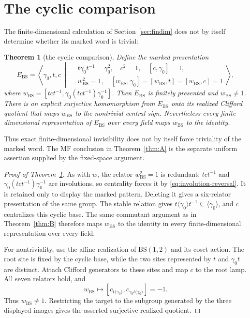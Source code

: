 \documentclass[11pt]{amsart}
\newcommand{\leanverified}[2]{\ignorespaces}
\newtheorem{theorem}{Theorem}[section]
\theoremstyle{definition}
\theoremstyle{remark}
\theoremstyle{plain}
\begin{document}
\section{The cyclic comparison}\label{sec:necessity}

The finite-dimensional calculation of
Section~\ref{sec:findim} does not by itself determine
whether its marked word is trivial:

\begin{theorem}[the cyclic comparison]\label{thm:C}
Define the marked presentation
\[
 E_{\mathrm{BS}}=\left\langle\gamma_0,t,c\ \middle|\
 \begin{aligned}
  &t\gamma_0t^{-1}=\gamma_0^2,\quad c^2=1,\quad[c,\gamma_0]=1,\\
  &w_{\mathrm{BS}}^2=1,\quad
    [w_{\mathrm{BS}},\gamma_0]=[w_{\mathrm{BS}},t]
      =[w_{\mathrm{BS}},c]=1
 \end{aligned}\right\rangle,
\]
where
$w_{\mathrm{BS}}=[tct^{-1},\gamma_0(tct^{-1})\gamma_0^{-1}]$.
Then $E_{\mathrm{BS}}$ is finitely presented and $w_{\mathrm{BS}}\ne1$.
There is an explicit surjective homomorphism from $E_{\mathrm{BS}}$ onto its
realized Clifford quotient that maps $w_{\mathrm{BS}}$ to the nontrivial
central sign.  Nevertheless every finite-dimensional representation of
$E_{\mathrm{BS}}$ over every field maps $w_{\mathrm{BS}}$ to the identity.
\leanverified{Monsters/LiteralCyclicCalibration}{GroupApproximation.LiteralCyclicCalibration.manuscriptCyclicCalibration}
\end{theorem}

Thus exact finite-dimensional invisibility does not by itself force
triviality of the marked word.  The MF conclusion in
Theorem~\ref{thm:A} is the separate uniform assertion supplied by the
fixed-space argument.


\begin{proof}[Proof of Theorem~\ref{thm:C}]
As with $w$, the relator $w_{\mathrm{BS}}^2=1$ is redundant: $tct^{-1}$
and $\gamma_0(tct^{-1})\gamma_0^{-1}$ are involutions, so centrality
forces it by \eqref{eq:involution-reversal}.  It is retained only to
display the marked pattern.  Deleting it gives a six-relator
presentation of the same group.
The stable relation gives
\(t\langle\gamma_0\rangle t^{-1}\subseteq
\langle\gamma_0\rangle\), and \(c\) centralizes this cyclic base.
The same commutant argument as in Theorem~\ref{thm:B} therefore maps
\(w_{\mathrm{BS}}\) to the identity in every finite-dimensional
representation over every field.

For nontriviality, use the affine realization of
\(\mathrm{BS}(1,2)\) and its coset action.  The root site is fixed by the
cyclic base, while the two sites represented by \(t\) and \(\gamma_0t\)
are distinct.  Attach Clifford generators to these sites and map \(c\) to
the root lamp.  All seven relators hold, and
\[
 w_{\mathrm{BS}}\longmapsto
 [c_{t\langle\gamma_0\rangle},
  c_{\gamma_0t\langle\gamma_0\rangle}]
 =-1.
\]
Thus \(w_{\mathrm{BS}}\ne1\).  Restricting the target to the subgroup
generated by the three displayed images gives the asserted surjective
realized quotient.
\end{proof}
\end{document}
